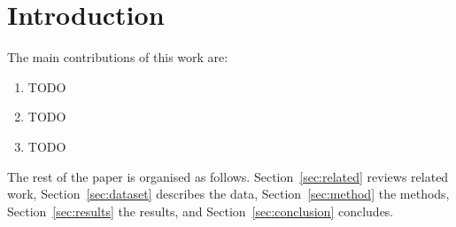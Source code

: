 \section{Introduction}\label{sec:intro}


The main contributions of this work are:
\begin{enumerate}
  \item TODO
  \item TODO
  \item TODO
\end{enumerate}

The rest of the paper is organised as follows. Section~\ref{sec:related} reviews
related work, Section~\ref{sec:dataset} describes the data,
Section~\ref{sec:method} the methods, Section~\ref{sec:results} the results,
and Section~\ref{sec:conclusion} concludes.
